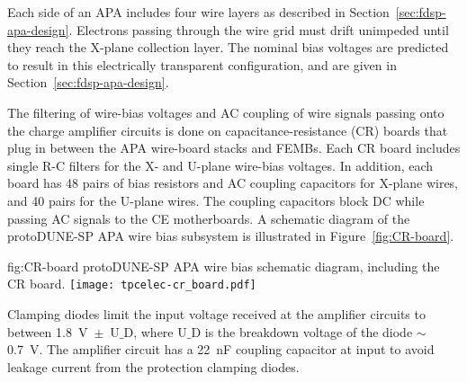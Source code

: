 Each side of an APA includes four wire layers as described in Section~\ref{sec:fdsp-apa-design}. 
Electrons passing through the wire grid must drift unimpeded until they reach the X-plane 
collection layer. The nominal bias voltages are predicted to result in this electrically 
transparent configuration, and are given in Section~\ref{sec:fdsp-apa-design}. 

The filtering of wire-bias voltages and AC coupling of wire signals passing
onto the charge amplifier circuits is done on capacitance-resistance (CR) boards that plug in between the APA wire-board stacks and FEMBs.
Each CR board includes single R-C filters for the X- and U-plane wire-bias voltages. In addition, each board has 48 
pairs of bias resistors and AC coupling capacitors for X-plane wires, and 40 pairs for the U-plane wires. The coupling capacitors block DC while passing AC 
signals to the CE motherboards.  A schematic diagram of the protoDUNE-SP APA wire bias subsystem is illustrated in Figure~\ref{fig:CR-board}.

\begin{dunefigure}
{fig:CR-board}
{protoDUNE-SP APA wire bias schematic diagram, including the CR board.}
\texttt{[image: tpcelec-cr\_board.pdf]}
\end{dunefigure}


Clamping diodes limit the input voltage received at the amplifier circuits to between 1.8~V~$\pm$~U$\_$D, where U$\_$D
is the breakdown voltage of the diode $\sim$0.7~V.
The amplifier circuit has a 22~nF coupling capacitor at input to avoid leakage current from the protection clamping diodes. 


